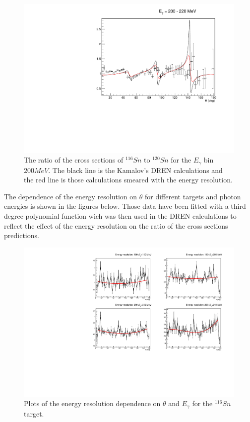 \begin{figure}[H]
\begin{center}
\includegraphics[scale=0.55]{pictures/pdf/cross_ratio_kamalov_Sn116_Sn120_Ebin8.pdf}
\caption{The ratio of the cross sections of $^{116}Sn$ to $^{120}Sn$ for the $E_{\gamma}$ bin $200 MeV$. The black line is the Kamalov's DREN calculations and the red line is those calculations smeared with the energy resolution.}
\label{cross_ratio1}
\end{center}
\end{figure}

\indent The dependence of the energy resolution on $\theta$ for different targets and photon energies is shown in the figures below. Those data have been fitted with a third degree polynomial function wich was then used in the DREN calculations to reflect the effect of the energy resolution on the ratio of the cross sections predictions.

\begin{figure}[H]
\begin{center}
\includegraphics[scale=0.75]{pictures/pdf/energy_resolution_sn116.pdf}
\caption{Plots of the energy resolution dependence on $\theta$ and $E_{\gamma}$ for the $^{116}Sn$ target.}
\label{energy_res1}
\end{center}
\end{figure}